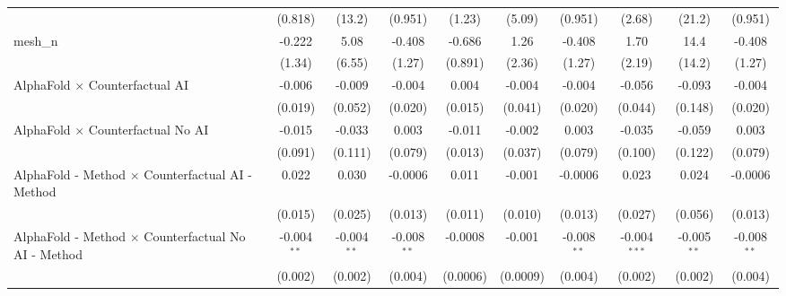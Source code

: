 \begin{tabular}{lccccccccc}
                                                               & (0.818)        & (13.2)         & (0.951)        & (1.23)         & (5.09)        & (0.951)        & (2.68)         & (21.2)        & (0.951)\\   
   mesh\_n                                                     & -0.222         & 5.08           & -0.408         & -0.686         & 1.26          & -0.408         & 1.70           & 14.4          & -0.408\\   
                                                               & (1.34)         & (6.55)         & (1.27)         & (0.891)        & (2.36)        & (1.27)         & (2.19)         & (14.2)        & (1.27)\\   
   AlphaFold $\times$ Counterfactual AI                        & -0.006         & -0.009         & -0.004         & 0.004          & -0.004        & -0.004         & -0.056         & -0.093        & -0.004\\   
                                                               & (0.019)        & (0.052)        & (0.020)        & (0.015)        & (0.041)       & (0.020)        & (0.044)        & (0.148)       & (0.020)\\   
   AlphaFold $\times$ Counterfactual No AI                     & -0.015         & -0.033         & 0.003          & -0.011         & -0.002        & 0.003          & -0.035         & -0.059        & 0.003\\   
                                                               & (0.091)        & (0.111)        & (0.079)        & (0.013)        & (0.037)       & (0.079)        & (0.100)        & (0.122)       & (0.079)\\   
   AlphaFold - Method $\times$ Counterfactual AI - Method      & 0.022          & 0.030          & -0.0006        & 0.011          & -0.001        & -0.0006        & 0.023          & 0.024         & -0.0006\\   
                                                               & (0.015)        & (0.025)        & (0.013)        & (0.011)        & (0.010)       & (0.013)        & (0.027)        & (0.056)       & (0.013)\\   
   AlphaFold - Method $\times$ Counterfactual No AI - Method   & -0.004$^{**}$  & -0.004$^{**}$  & -0.008$^{**}$  & -0.0008        & -0.001        & -0.008$^{**}$  & -0.004$^{***}$ & -0.005$^{**}$ & -0.008$^{**}$\\   
                                                               & (0.002)        & (0.002)        & (0.004)        & (0.0006)       & (0.0009)      & (0.004)        & (0.002)        & (0.002)       & (0.004)\\   

\end{tabular}

